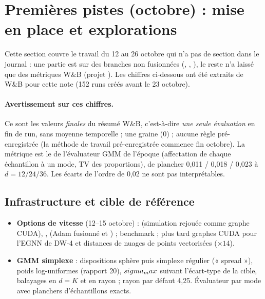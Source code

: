 \section{Premières pistes (octobre) : mise en place et explorations}
\label{sec:debuts}

Cette section couvre le travail du 12 au 26 octobre qui n'a pas de section dans le journal : une partie est sur des branches non fusionnées (, , ), le reste n'a laissé que des métriques W\&B (projet ). Les chiffres ci-dessous ont été extraits de W\&B pour cette note (152 runs créés avant le 23 octobre).

\paragraph{Avertissement sur ces chiffres.} Ce sont les valeurs \emph{finales} du résumé W\&B, c'est-à-dire \emph{une seule évaluation} en fin de run, sans moyenne temporelle ; une graine (0) ; aucune règle pré-enregistrée (la méthode de travail pré-enregistrée commence fin octobre). La métrique est le  de l'évaluateur GMM de l'époque (affectation de chaque échantillon à un mode, TV des proportions), de plancher 0,011 / 0,018 / 0,023 à $d=12/24/36$. Les écarts de l'ordre de 0,02 ne sont pas interprétables.

\subsection{Infrastructure et cible de référence}
\begin{itemize}
  \item \textbf{Options de vitesse} (12--15 octobre) :  (simulation rejouée comme graphe CUDA), ,  (Adam fusionné et ) ; benchmark  ; plus tard graphes CUDA pour l'EGNN de DW-4 et distances de nuages de points vectorisées ($\times14$).
  \item \textbf{GMM simplexe} : dispositions sphère puis simplexe régulier (« spread »), poids log-uniformes (rapport 20), $sigma_max$ suivant l'écart-type de la cible, balayages en $d=K$ et en rayon ; rayon par défaut 4,25. Évaluateur par mode avec planchers d'échantillons exacts.
\end{itemize}

